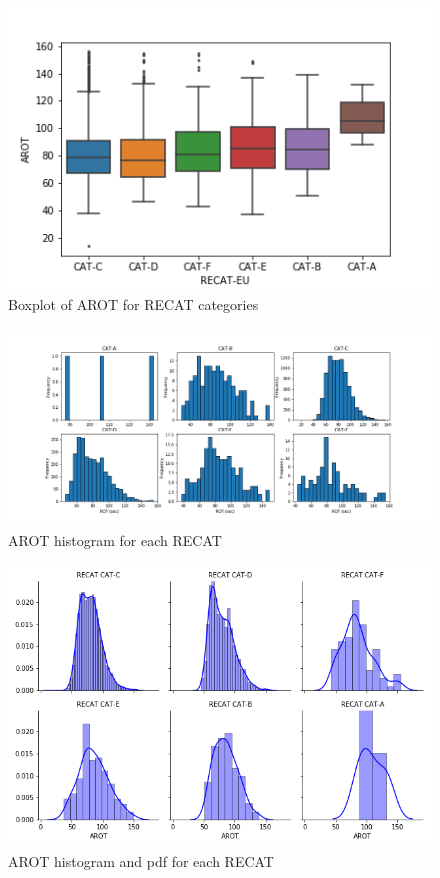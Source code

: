 \begin{figure}
    \centering
    \includegraphics[width=1\textwidth]{graphics/each_recat_box.png}
    \caption[Boxplot of AROT for RECAT categories]{Boxplot of AROT for RECAT categories}
    \label{fig:each_recat_box}
\end{figure}


\begin{figure}
    \centering
    \includegraphics[width=1\textwidth]{graphics/each_recat_hist.png}
    \caption[AROT histogram for each RECAT]{AROT histogram for each RECAT}
    \label{fig:each_recat_hist}
\end{figure}


\begin{figure}
    \centering
    \includegraphics[width=1\textwidth]{graphics/each_recat_hist_dist.png}
    \caption[AROT histogram and pdf for each RECAT]{AROT histogram and pdf for each RECAT}
    \label{fig:each_recat_hist_dist}
\end{figure}

